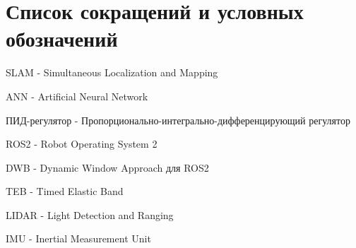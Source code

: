 \chapter*{Список сокращений и условных обозначений}
\label{ch:abbreviations}

SLAM - Simultaneous Localization and Mapping

ANN - Artificial Neural Network

ПИД-регулятор - Пропорционально-интегрально-дифференцирующий регулятор

ROS2 - Robot Operating System 2

DWB - Dynamic Window Approach для ROS2

TEB - Timed Elastic Band

LIDAR - Light Detection and Ranging

IMU - Inertial Measurement Unit

\endinput